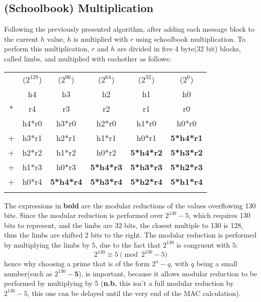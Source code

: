 \documentclass[twocolumn]{article}
\begin{document}
\subsection{(Schoolbook) Multiplication}
Following the previously presented algorithm, after adding each message block to the current $h$ value, $h$ is multiplied with $r$ using schoolbook multiplication. 
To perform this multiplication, $r$ and $h$ are divided in five 4 byte(32 bit) blocks, called limbs\label{def_limb}, and multiplied with eachother as follows:
\begin{footnotesize}
\begin{tabular}{cccccc}
\\
    & ($2^{128}$)   & ($2^{96}$)    & ($2^{64}$)    & ($2^{32}$)    & ($2^{0}$)     \\
    & h4            & h3            & h2            & h1            & h0            \\
*   & r4            & r3            & r2            & r1            & r0            \\
\hline
    & h4*r0 & h3*r0 & h2*r0 & h1*r0 & h0*r0 \\
+   & h3*r1 & h2*r1 & h1*r1 & h0*r1 & \textbf{5*h4*r1} \\
+   & h2*r2 & h1*r2 & h0*r2 & \textbf{5*h4*r2} & \textbf{5*h3*r2} \\
+   & h1*r3 & h0*r3 & \textbf{5*h4*r3} & \textbf{5*h3*r3} & \textbf{5*h2*r3} \\
+   & h0*r4 & \textbf{5*h4*r4} & \textbf{5*h3*r4} & \textbf{5*h2*r4} & \textbf{5*h1*r4}\\
    &    &    &    &    &    \\
\end{tabular}
\end{footnotesize}
The expressions in \textbf{bold} are the modular reductions of the values overflowing 130 bits. Since the modular reduction is performed over $2^{130}-5$, which requires 130 bits
to represent, and the limbs are 32 bits, the closest multiple to 130 is 128, thus the limbs are shifted 2 bits to the right. The modular reduction is performed by multiplying the
limbs by $5$, due to the fact that $2^{130}$ is congruent with $5$:
$$2^{130} \equiv 5 \pmod{2^{130}-5}$$ 
hence why choosing a prime that is of the form $2^n-q$, with $q$ being a small number(such as $2^{130}-\textbf{5}$), is important, because it allows modular reduction to be 
performed by multiplying by 5 (\textbf{n.b.} this isn't a full modular reduction by $2^{130}-5$, this one can be delayed until the very end of the MAC calculation).
\end{document}
